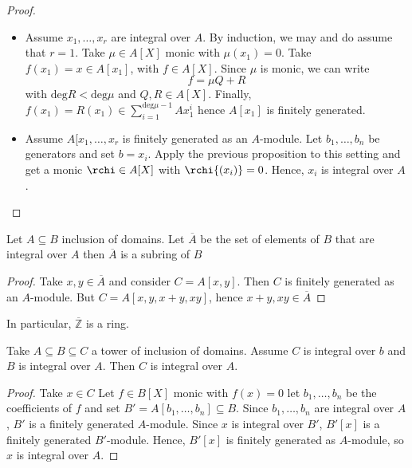 \begin{proof}\( \)
\begin{itemize}
    \item[\(\implies \)] Assume \(x_{1}, \dots, x_r\) are integral over \(A\).
        By induction, we may and do assume that \(r=1\). Take \(\mu \in A[X]\)
        monic with \(\mu {(x_{1})} = 0\). Take \(f{(x_{1})} = x \in A[x_{1}]\),
        with \(f \in A[X]\). Since \(\mu\) is monic, we can write
        \[
          f = \mu Q + R
        \]
        with \(\mathrm{deg}R < \mathrm{deg} \mu\) and \(Q, R \in A[X]\).
        Finally, \(f{(x_{1})} = R{(x_{1})} \in \sum_{i=1}^{\mathrm{deg}\mu - 1}
        Ax_{1}^{i}\) hence \(A[x_{1}]\) is finitely generated.
    \item[\(\impliedby \)] Assume \(A[x_{1}, \dots, x_r\) is finitely generated
        as an \(A\)-module. Let \(b_{1}, \dots, b_n\) be generators and set \(b
        = x_{i}\). Apply the previous proposition to this setting and get a
        monic \(\rchi \in A[X]\) with \(\rchi {(x_{i})} = 0\). Hence, \(x_{i}\)
        is integral over \(A\).
\end{itemize}
\end{proof}

\begin{corollary}{}
    Let \(A \subseteq B \) inclusion of domains. Let \(\overline{A}\) be the set
    of elements of \(B\) that are integral over \(A\) then \(\overline{A}\) is a
    subring of \(B\) 
\end{corollary}
\begin{proof}{}
    Take \(x, y \in \overline{A}\) and consider \(C = A[x, y]\). Then \(C\) is
    finitely generated as an \(A\)-module. But \(C = A[x, y, x+y, xy]\), hence
    \(x+y, xy \in \overline{A}\) 
\end{proof}
In particular, \(\overline{\mathbb{Z}}\) is a ring.
\begin{corollary}{}
    Take \(A \subseteq B \subseteq C  \) a tower of inclusion of domains. Assume
    \(C\) is integral over \(b\) and \(B\) is integral over \(A\). Then \(C\) is
    integral over \(A\).
\end{corollary}
\begin{proof}{}
    Take \(x \in C\) Let \(f \in B[X]\) monic with \(f{(x)} = 0\) let \(b_{1},
    \dots, b_{n}\) be the coefficients of \(f\) and set \(B' = A[b_{1}, \dots,
    b_{n}] \subseteq B \). Since \(b_{1}, \dots, b_{n}\) are integral over
    \(A\), \(B'\) is a finitely generated \(A\)-module. Since \(x\) is integral
    over \(B'\), \(B'[x]\) is a finitely generated \(B'\)-module. Hence,
    \(B'[x]\) is finitely generated as \(A\)-module, so \(x\) is integral over
    \(A\).
\end{proof}

